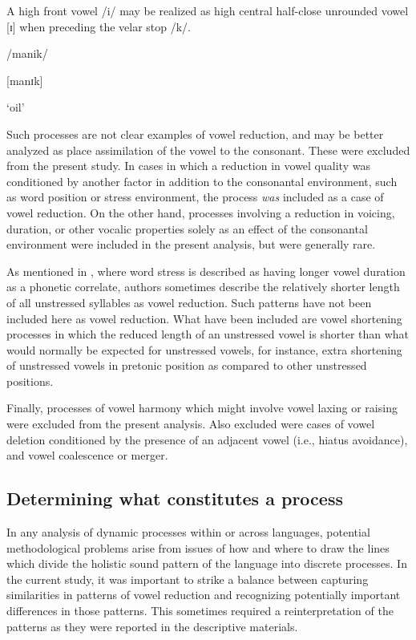 \ea\label{ex:(6.10)}

A high front vowel /i/ may be realized as high central half-close unrounded vowel [ɪ] when preceding the velar stop /k/.

/manik/

[manɪk]

\glt ‘oil’

\citep[15]{Dol2007}

\z

Such processes are not clear examples of vowel reduction, and may be better analyzed as place assimilation of the vowel to the consonant. These were excluded from the present study. In cases in which a reduction in vowel quality was conditioned by another factor in addition to the consonantal environment, such as word position or stress environment, the process \textit{was} included as a case of vowel reduction. On the other hand, processes involving a reduction in voicing, duration, or other vocalic properties solely as an effect of the consonantal environment were included in the present analysis, but were generally rare.

  As mentioned in , where word stress is described as having longer vowel duration as a phonetic correlate, authors sometimes describe the relatively shorter length of all unstressed syllables as vowel reduction. Such patterns have not been included here as vowel reduction. What have been included are vowel shortening processes in which the reduced length of an unstressed vowel is shorter than what would normally be expected for unstressed vowels, for instance, extra shortening of unstressed vowels in pretonic position as compared to other unstressed positions.

  Finally, processes of vowel harmony which might involve vowel laxing or raising were excluded from the present analysis. Also excluded were cases of vowel deletion conditioned by the presence of an adjacent vowel (i.e., hiatus avoidance), and vowel coalescence or merger.

\subsection{Determining what constitutes a process}\label{sec:6.2.2}

  In any analysis of dynamic processes within or across languages, potential methodological problems arise from issues of how and where to draw the lines which divide the holistic sound pattern of the language into discrete processes. In the current study, it was important to strike a balance between capturing similarities in patterns of vowel reduction and recognizing potentially important differences in those patterns. This sometimes required a reinterpretation of the patterns as they were reported in the descriptive materials.


